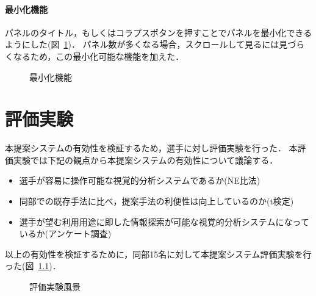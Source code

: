 \documentclass[sotsuron]{kuee}
\begin{document}
			\subsubsection{最小化機能}
				パネルのタイトル，もしくはコラプスボタンを押すことでパネルを最小化できるようにした(図~\ref{fig:collapse})．
				パネル数が多くなる場合，スクロールして見るには見づらくなるため，この最小化可能な機能を加えた．
					\begin{figure}
						\begin{center}
						\end{center}
						\caption{最小化機能}
				  		\label{fig:collapse}
					\end{figure}
\chapter{評価実験}
	本提案システムの有効性を検証するため，選手に対し評価実験を行った．
	本評価実験では下記の観点から本提案システムの有効性について議論する．
	\begin{itemize}
		\item 選手が容易に操作可能な視覚的分析システムであるか(NE比法)
		\item 同部での既存手法に比べ，提案手法の利便性は向上しているのか(t検定)
		\item 選手が望む利用用途に即した情報探索が可能な視覚的分析システムになっているか(アンケート調査)
	\end{itemize}
	以上の有効性を検証するために，同部15名に対して本提案システム評価実験を行った(図~\ref{fig:experi})．
		\begin{figure}
			\begin{center}
			\end{center}
			\caption{評価実験風景}
	  		\label{fig:experi}
		\end{figure}
\end{document}

